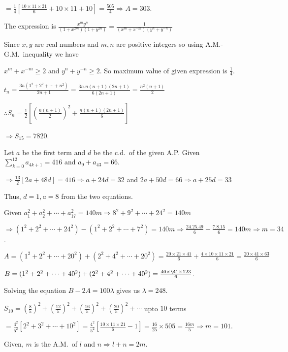   $= \frac{1}{4}\left[\frac{10\times 11\times 21}{6} + 10\times 11 + 10\right] = \frac{505}{4}\Rightarrow A
  = 303$.
\item The expression is $\frac{x^my^n}{\left(1 + x^{2m}\right)\left(1 + y^{2n}\right)} = \frac{1}{\left(x^m
  + x^{-m}\right)\left(y^n + y^{-n}\right)}$

  Since $x, y$ are real numbers and $m, n$ are positive integers so using A.M.-G.M.\ inequality we have

  $x^m + x^{-m}\geq 2$ and $y^n + y^{-n}\geq 2$. So maximum value of given expression is $\frac{1}{4}$.
\item $t_n = \frac{3n(1^2 + 2^2 + \cdots + n^2)}{2n + 1} = \frac{3n.n(n + 1)(2n + 1)}{6(2n + 1)}
  = \frac{n^2(n + 1)}{2}$

  $\therefore S_n = \frac{1}{2}\left[\left(\frac{n(n + 1)}{2}\right)^2 + \frac{n(n + 1)(2n + 1)}{6}\right]$

  $\Rightarrow S_{15} = 7820$.
\item Let $a$ be the first term and $d$ be the c.d.\ of the given A.P. Given $\displaystyle\sum_{k =
  0}^{12}a_{4k + 1} = 416$ and $a_9 + a_{43} = 66$.

  $\Rightarrow \frac{13}{2}[2a + 48d] = 416 \Rightarrow a + 24d = 32$ and $2a + 50d = 66 \Rightarrow a + 25d
  = 33$

  Thus, $d = 1, a = 8$ from the two equations.

  Given $a_1^2 + a_2^2 + \cdots + a_{17}^2 = 140m \Rightarrow 8^2 + 9^2 + \cdots + 24^2 = 140m$

  $\Rightarrow (1^2 + 2^2 + \cdots + 24^2) - (1^2 + 2^2 + \cdots + 7^2) = 140m\Rightarrow \frac{24.25.49}{6}
  - \frac{7.8.15}{6} = 140m\Rightarrow m = 34$.
\item $A = (1^2 + 2^2 + \cdots + 20^2) + (2^2 + 4^2 + \cdots + 20^2) = \frac{20\times21\times41}{6}
  + \frac{4\times10\times11\times 21}{6} = \frac{20\times41\times 63}{6}$

  $B = (1^2 + 2^2 + \cdots + 40^2) + (2^2 + 4^2 + \cdots + 40^2) = \frac{40\times\41\times 123}{6}$.

  Solving the equation $B - 2A = 100\lambda$ gives us $\lambda = 248$.
\item $S_{10} = \left(\frac{8}{5}\right)^2 + \left(\frac{12}{5}\right)^2 + \left(\frac{16}{5}\right)^2
  + \left(\frac{20}{5}\right)^2 + \cdots$ upto $10$ terms

  $= \frac{4^2}{5^2}[2^2 + 3^2 + \cdots + 10^2] = \frac{4^2}{5^2}\left[\frac{10\times11\times21}{6} -
    1\right] = \frac{16}{25}\times505 = \frac{16m}{5}\Rightarrow m = 101$.
\item Given, $m$ is the A.M.\ of $l$ and $n\Rightarrow l + n = 2m$.

